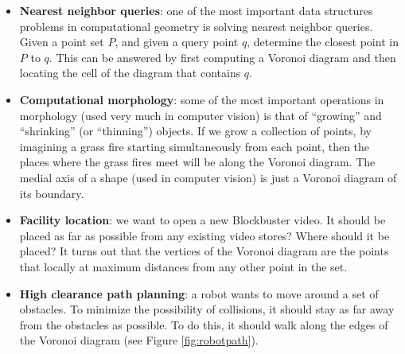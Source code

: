 \documentclass[]{usiinfbachelorproject}
\begin{document}
\begin{itemize}
	\item {\bf Nearest neighbor queries}: one of the most important data structures problems in computational geometry is solving nearest neighbor queries. Given a point set $P$, and given a query point $q$, determine the closest point in $P$ to $q$. This can be answered by first computing a Voronoi diagram and then locating the cell of the diagram that contains $q$.
	\item {\bf Computational morphology}: some of the most important operations in morphology (used very much in computer vision) is that of ``growing'' and ``shrinking'' (or ``thinning'') objects. If we grow a collection of points, by imagining a grass fire starting simultaneously from each point, then the places where the grass fires meet will be along the Voronoi diagram. The medial axis of a shape (used in computer vision) is just a Voronoi diagram of its boundary.
	\item {\bf Facility location}: we want to open a new Blockbuster video. It should be placed as far as possible from any existing video stores? Where should it be placed? It turns out that the vertices of the Voronoi diagram are the points that locally at maximum distances from any other point in the set.
	\item {\bf High clearance path planning}: a robot wants to move around a set of obstacles. To minimize the possibility of collisions, it should stay as far away from the obstacles as possible. To do this, it should walk along the edges of the Voronoi diagram (see Figure \ref{fig:robotpath}). 
\end{itemize}
\end{document}
